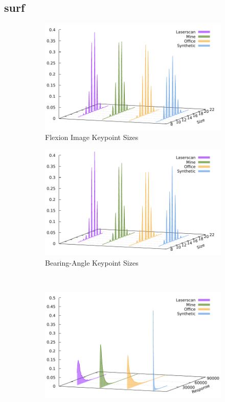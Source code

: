 \subsection{\acrshort{surf}}\label{sec:surf_stats}
\begin{figure}[H]
\begin{subfigure}[t]{0.45\linewidth}
    \includegraphics[width=\linewidth]{chapter06/results/SURF/flexion/size.pdf}%
    \caption{Flexion Image Keypoint Sizes}
\end{subfigure}\quad
\begin{subfigure}[t]{0.45\linewidth}
    \includegraphics[width=\linewidth]{chapter06/results/SURF/bearing/size.pdf}
    \caption{Bearing-Angle Keypoint Sizes}
\end{subfigure}\\
\begin{subfigure}[t]{0.45\linewidth}
    \includegraphics[width=\linewidth]{chapter06/results/SURF/flexion/response.pdf}%

\end{subfigure}
\end{figure}
